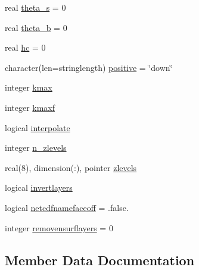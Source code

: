 \begin{DoxyCompactItemize}
\item 
real \mbox{\hyperlink{structmodulenetcdfcf__2__hdf5mohid_1_1t__depth_ad89382f82cdf551c83f5c72fd52b850d}{theta\+\_\+s}} = 0
\item 
real \mbox{\hyperlink{structmodulenetcdfcf__2__hdf5mohid_1_1t__depth_a492c5b6b762fae230874c12aa887e589}{theta\+\_\+b}} = 0
\item 
real \mbox{\hyperlink{structmodulenetcdfcf__2__hdf5mohid_1_1t__depth_aeaa0d3db0428dcd004609f0ff26abf8f}{hc}} = 0
\item 
character(len=stringlength) \mbox{\hyperlink{structmodulenetcdfcf__2__hdf5mohid_1_1t__depth_af10b3addd9391a3ebfe5f492892de623}{positive}} = \char`\"{}down\char`\"{}
\item 
integer \mbox{\hyperlink{structmodulenetcdfcf__2__hdf5mohid_1_1t__depth_ae0351b330e94c338ca7795e86a0f1a03}{kmax}}
\item 
integer \mbox{\hyperlink{structmodulenetcdfcf__2__hdf5mohid_1_1t__depth_a46dfdd69ef638f53b84772a99efbb0d0}{kmaxf}}
\item 
logical \mbox{\hyperlink{structmodulenetcdfcf__2__hdf5mohid_1_1t__depth_ab5e35850c3ae9eadd407cf073576fbef}{interpolate}}
\item 
integer \mbox{\hyperlink{structmodulenetcdfcf__2__hdf5mohid_1_1t__depth_a54f4281e8b0bac633ddd95410009eff8}{n\+\_\+zlevels}}
\item 
real(8), dimension(\+:), pointer \mbox{\hyperlink{structmodulenetcdfcf__2__hdf5mohid_1_1t__depth_a211824d21f36b492c7cec9c8f899fe93}{zlevels}}
\item 
logical \mbox{\hyperlink{structmodulenetcdfcf__2__hdf5mohid_1_1t__depth_ab979bb65f6c2f25a6a8afca69ba38374}{invertlayers}}
\item 
logical \mbox{\hyperlink{structmodulenetcdfcf__2__hdf5mohid_1_1t__depth_af472924efbcc3e854556df926b9d9cee}{netcdfnamefaceoff}} = .false.
\item 
integer \mbox{\hyperlink{structmodulenetcdfcf__2__hdf5mohid_1_1t__depth_a3831b8e28a09918270c5d5445e9f6351}{removensurflayers}} = 0
\end{DoxyCompactItemize}


\subsection{Member Data Documentation}
\mbox{\label{structmodulenetcdfcf__2__hdf5mohid_1_1t__depth_a731dabea60cff391370f3e1356138022}} 
